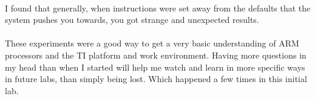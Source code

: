 \documentclass[12pt,a4paper,notitlepage]{report}
\begin{document}
\begin{normalsize}
\paragraph*{}
I found that generally, when instructions were set away from the defaults that the system pushes you towards, you got strange and unexpected results. 

\paragraph*{}
These experiments were a good way to get a very basic understanding of ARM processors and the TI platform and work environment. Having more questions in my head than when I started will help me watch and learn in more specific ways in future labs, than simply being lost. Which happened a few times in this initial lab. 

\end{normalsize}
\end{document}
